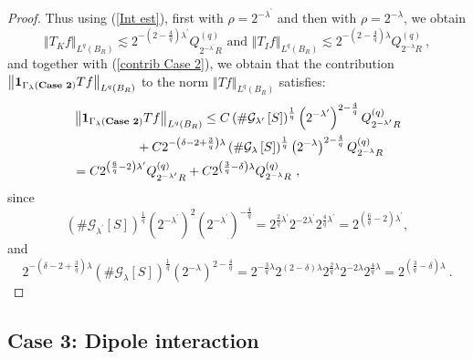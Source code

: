 \documentclass{amsart}%
\theoremstyle{plain}
\numberwithin{equation}{section}
\begin{document}
\begin{proof}
Thus using (\ref{Int est}), first with $\rho=2^{-\lambda^{\prime}}$ and then
with $\rho=2^{-\lambda}$, we obtain%
\[
\left\Vert T_{K}f\right\Vert _{L^{q}\left(  B_{R}\right)  }\lesssim2^{-\left(
2-\frac{4}{q}\right)  \lambda^{\prime}}Q_{2^{-\lambda^{\prime}}R}^{\left(
q\right)  }\text{ and }\left\Vert T_{I}f\right\Vert _{L^{q}\left(
B_{R}\right)  }\lesssim2^{-\left(  2-\frac{4}{q}\right)  \lambda
}Q_{2^{-\lambda}R}^{\left(  q\right)  }\ ,
\]
and together with (\ref{contrib Case 2}), we obtain that the contribution
$\left\Vert \mathbf{1}_{\Gamma_{\lambda}\left(  \text{\textbf{Case 2}}\right)
}Tf\right\Vert _{L^{q}\left(  B_{R}\right)  }$ to the norm $\left\Vert
Tf\right\Vert _{L^{q}\left(  B_{R}\right)  }$ satisfies:
\begin{align}
&  \left\Vert \mathbf{1}_{\Gamma_{\lambda}\left(  \text{\textbf{Case 2}%
}\right)  }Tf\right\Vert _{L^{q}\left(  B_{R}\right)  }\leq C\left(
\#\mathcal{G}_{\lambda^{\prime}}\left[  S\right]  \right)  ^{\frac{1}{q}%
}\left(  2^{-\lambda^{\prime}}\right)  ^{2-\frac{4}{q}}Q_{2^{-\lambda^{\prime
}}R}^{\left(  q\right)  }\label{case 2 est}\\
&  \ \ \ \ \ \ \ \ \ \ \ \ \ \ \ +C2^{-\left(  \delta-2+\frac{3}{q}\right)
\lambda}\left(  \#\mathcal{G}_{\lambda}\left[  S\right]  \right)  ^{\frac
{1}{q}}\left(  2^{-\lambda}\right)  ^{2-\frac{4}{q}}Q_{2^{-\lambda}R}^{\left(
q\right)  }\nonumber\\
&  =C2^{\left(  \frac{6}{q}-2\right)  \lambda^{\prime}}Q_{2^{-\lambda^{\prime
}}R}^{\left(  q\right)  }+C2^{\left(  \frac{3}{q}-\delta\right)  \lambda
}Q_{2^{-\lambda}R}^{\left(  q\right)  }\ ,\nonumber
\end{align}
since%
\[
\left(  \#\mathcal{G}_{\lambda^{\prime}}\left[  S\right]  \right)  ^{\frac
{1}{q}}\left(  2^{-\lambda^{\prime}}\right)  ^{2}\left(  2^{-\lambda^{\prime}%
}\right)  ^{-\frac{4}{q}}=2^{\frac{2}{q}\lambda^{\prime}}2^{-2\lambda^{\prime
}}2^{\frac{4}{q}\lambda^{\prime}}=2^{\left(  \frac{6}{q}-2\right)
\lambda^{\prime}},
\]
and%
\[
2^{-\left(  \delta-2+\frac{3}{q}\right)  \lambda}\left(  \#\mathcal{G}%
_{\lambda}\left[  S\right]  \right)  ^{\frac{1}{q}}\left(  2^{-\lambda
}\right)  ^{2-\frac{4}{q}}=2^{-\frac{3}{q}\lambda}2^{\left(  2-\delta\right)
\lambda}2^{\frac{2}{q}\lambda}2^{-2\lambda}2^{\frac{4}{q}\lambda}=2^{\left(
\frac{3}{q}-\delta\right)  \lambda}\ .
\]

\end{proof}

\subsection{Case 3: Dipole interaction\label{Sub Case 3}}
\end{document}
